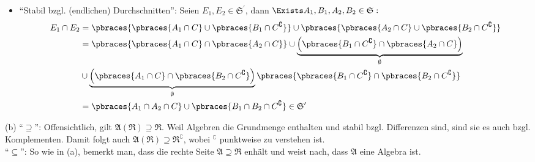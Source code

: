\begin{solution}
\begin{itemize}
\begin{itemize}
    \item \enquote{Stabil bzgl. (endlichen) Durchschnitten}: Seien $E_1, E_2 \in \mathfrak{S}^\prime$, dann $\Exists A_1, B_1, A_2, B_2 \in \mathfrak{S}:$
    \begin{align*}
      E_1 \cap E_2
      & = \pbraces{\pbraces{A_1 \cap C} \cup \pbraces{B_1 \cap C^\complement}} \cup
        \pbraces{\pbraces{A_2 \cap C} \cup \pbraces{B_2 \cap C^\complement}} \\
      & = \pbraces{\pbraces{A_1 \cap C} \cap \pbraces{A_2 \cap C}} \cup
          \underbrace
          {
            \Big (
            \pbraces{B_1 \cap C^\complement} \cap \pbraces{A_2 \cap C}
            \Big )
          }_\emptyset \\
      & \cup \underbrace
          {
            \Big (
            \pbraces{A_1 \cap C} \cap \pbraces{B_2 \cap C^\complement}
            \Big )
            }_\emptyset
            \pbraces
          {
            \pbraces{B_1 \cap C^\complement} \cap
            \pbraces{B_2 \cap C^\complement}
          } \\
      & = \pbraces{A_1 \cap A_2 \cap C} \cup
          \pbraces{B_1 \cap B_2 \cap C^\complement}
          \in \mathfrak{S}^\prime
    \end{align*}

  \end{itemize}

\end{itemize}

(b) \enquote{$\supseteq$}: Offensichtlich, gilt $\mathfrak{A}(\mathfrak{R}) \supseteq \mathfrak{R}$. Weil Algebren die Grundmenge enthalten und stabil bzgl. Differenzen sind, sind sie es auch bzgl. Komplementen. Damit folgt auch $\mathfrak{A}(\mathfrak{R}) \supseteq \mathfrak{R}^\complement$, wobei $^\complement$ punktweise zu verstehen ist. \\

\enquote{$\subseteq$}: So wie in (a), bemerkt man, dass die rechte Seite $\mathfrak{A} \supseteq \mathfrak{R}$ enhält und weist nach, dass $\mathfrak{A}$ eine Algebra ist.

\end{solution}


